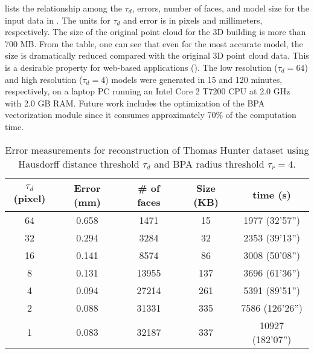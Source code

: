  lists the relationship among the $\tau_d$, errors,
number of faces, and model size for the input data in .
The units for $\tau_d$ and error is in pixels and millimeters, respectively.
The size of the original point cloud for the 3D building is more than 700 MB.
From the table, one can see that even for the most accurate model, the size
is dramatically reduced compared with the original 3D point cloud data.
This is a desirable property for web-based applications ().
The low resolution ($\tau_d = 64$) and high resolution ($\tau_d = 4$) models
were generated in 15 and 120 minutes, respectively,
on a laptop PC running an Intel Core 2 T7200 CPU at 2.0 GHz with 2.0 GB RAM.
Future work includes the optimization of the BPA vectorization module since
it consumes approximately 70\% of the computation time.

\setlength{\tabcolsep}{4pt}
\begin{table}[hbtp]
\begin{center}
\begin{tabular}[t]{||c||c|c|c|c||}
\hline
$\tau_{d} $(pixel) & Error (mm)& \# of faces & Size (KB) & time (s) \\ \hline \hline
64 & 0.658 & 1471  & 15  & 1977  (32'57'') \\ \hline 
32 & 0.294 & 3284  & 32  & 2353  (39'13'') \\ \hline
16 & 0.141 & 8574  & 86  & 3008  (50'08'') \\ \hline
8  & 0.131 & 13955 & 137 & 3696  (61'36'') \\ \hline
4  & 0.094 & 27214 & 261 & 5391  (89'51'') \\ \hline
2  & 0.088 & 31331 & 335 & 7586  (126'26'')\\ \hline
1  & 0.083 & 32187 & 337 & 10927 (182'07'')\\ \hline
\end{tabular}
\end{center}
\caption{Error measurements for reconstruction of Thomas Hunter dataset using
Hausdorff distance threshold $\tau_d$ and BPA radius threshold $\tau_r = 4$.}
\label{tbl:em}
\end{table}
\setlength{\tabcolsep}{1.4pt}


